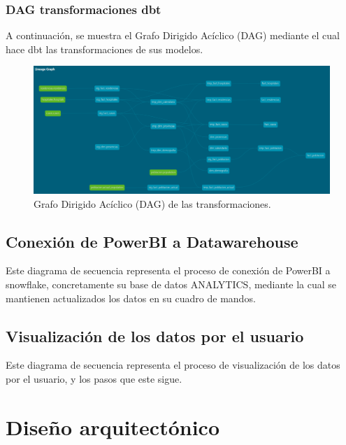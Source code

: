\subsubsection{DAG transformaciones dbt}
A continuación, se muestra el Grafo Dirigido Acíclico (DAG) mediante el cual hace dbt las transformaciones de sus modelos.

\begin{landscape}
\begin{figure}[h]
    \advance\leftskip-1.5cm 
    \includegraphics[scale=0.6]{img/DAG.PNG}
    \caption{Grafo Dirigido Acíclico (DAG) de las transformaciones.}
\end{figure}
\end{landscape}  

\subsection{Conexión de PowerBI a Datawarehouse}
Este diagrama de secuencia representa el proceso de conexión de PowerBI a snowflake, concretamente su base de datos ANALYTICS, mediante la cual se mantienen actualizados los datos en su cuadro de mandos.


\subsection{Visualización de los datos por el usuario}
Este diagrama de secuencia representa el proceso de visualización de los datos por el usuario, y los pasos que este sigue.


\section{Diseño arquitectónico}

